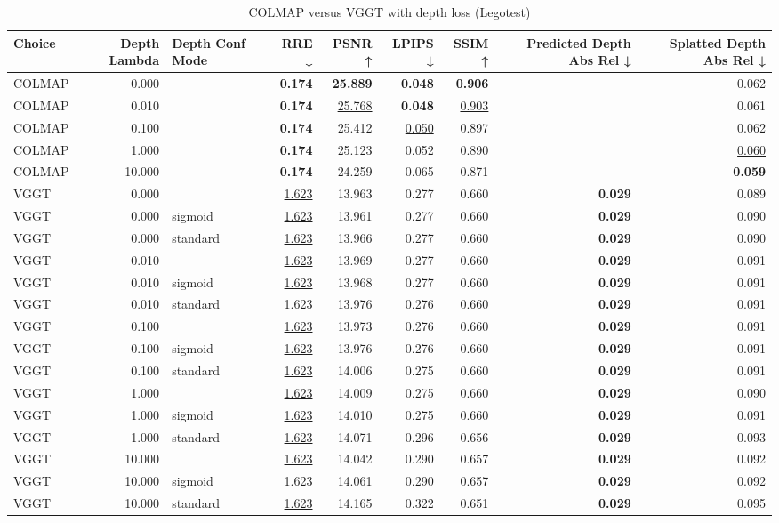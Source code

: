 \begin{table}[H]
\caption{COLMAP versus VGGT with depth loss (Legotest)}
\label{tab:05_depth_lambda_legotest}
\begin{tabular}{lrlrrrrrr}
\toprule
Choice & Depth Lambda & Depth Conf Mode & RRE ↓ & PSNR ↑ & LPIPS ↓ & SSIM ↑ & Predicted Depth Abs Rel ↓ & Splatted Depth Abs Rel ↓ \\
\midrule
COLMAP & 0.000 &  & \textbf{0.174} & \textbf{25.889} & \textbf{0.048} & \textbf{0.906} &  & 0.062 \\
COLMAP & 0.010 &  & \textbf{0.174} & \underline{25.768} & \textbf{0.048} & \underline{0.903} &  & 0.061 \\
COLMAP & 0.100 &  & \textbf{0.174} & 25.412 & \underline{0.050} & 0.897 &  & 0.062 \\
COLMAP & 1.000 &  & \textbf{0.174} & 25.123 & 0.052 & 0.890 &  & \underline{0.060} \\
COLMAP & 10.000 &  & \textbf{0.174} & 24.259 & 0.065 & 0.871 &  & \textbf{0.059} \\
VGGT & 0.000 &  & \underline{1.623} & 13.963 & 0.277 & 0.660 & \textbf{0.029} & 0.089 \\
VGGT & 0.000 & sigmoid & \underline{1.623} & 13.961 & 0.277 & 0.660 & \textbf{0.029} & 0.090 \\
VGGT & 0.000 & standard & \underline{1.623} & 13.966 & 0.277 & 0.660 & \textbf{0.029} & 0.090 \\
VGGT & 0.010 &  & \underline{1.623} & 13.969 & 0.277 & 0.660 & \textbf{0.029} & 0.091 \\
VGGT & 0.010 & sigmoid & \underline{1.623} & 13.968 & 0.277 & 0.660 & \textbf{0.029} & 0.091 \\
VGGT & 0.010 & standard & \underline{1.623} & 13.976 & 0.276 & 0.660 & \textbf{0.029} & 0.091 \\
VGGT & 0.100 &  & \underline{1.623} & 13.973 & 0.276 & 0.660 & \textbf{0.029} & 0.091 \\
VGGT & 0.100 & sigmoid & \underline{1.623} & 13.976 & 0.276 & 0.660 & \textbf{0.029} & 0.091 \\
VGGT & 0.100 & standard & \underline{1.623} & 14.006 & 0.275 & 0.660 & \textbf{0.029} & 0.091 \\
VGGT & 1.000 &  & \underline{1.623} & 14.009 & 0.275 & 0.660 & \textbf{0.029} & 0.090 \\
VGGT & 1.000 & sigmoid & \underline{1.623} & 14.010 & 0.275 & 0.660 & \textbf{0.029} & 0.091 \\
VGGT & 1.000 & standard & \underline{1.623} & 14.071 & 0.296 & 0.656 & \textbf{0.029} & 0.093 \\
VGGT & 10.000 &  & \underline{1.623} & 14.042 & 0.290 & 0.657 & \textbf{0.029} & 0.092 \\
VGGT & 10.000 & sigmoid & \underline{1.623} & 14.061 & 0.290 & 0.657 & \textbf{0.029} & 0.092 \\
VGGT & 10.000 & standard & \underline{1.623} & 14.165 & 0.322 & 0.651 & \textbf{0.029} & 0.095 \\
\bottomrule
\end{tabular}
\end{table}
